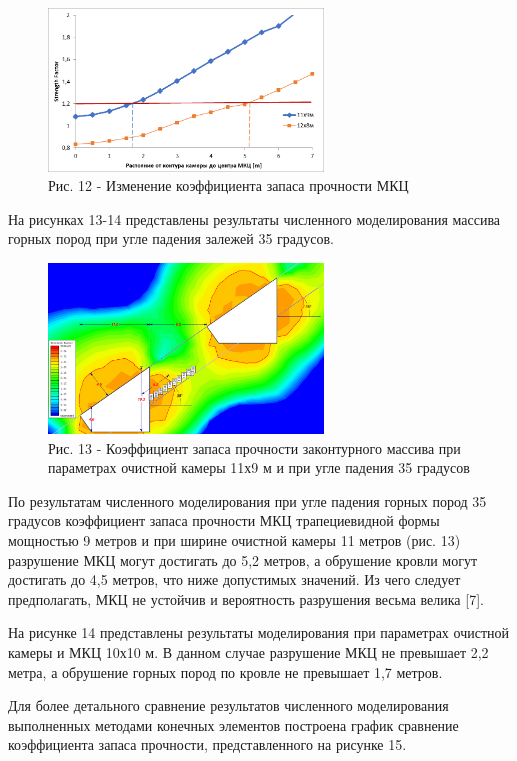 \begin{figure}[H]
	\centering
	\includegraphics[width=0.65\textwidth]{assets/292}
	\caption*{Рис. 12 - Изменение коэффициента запаса прочности МКЦ}
\end{figure}

На рисунках 13-14 представлены результаты численного моделирования
массива горных пород при угле падения залежей 35 градусов.

\begin{figure}[H]
	\centering
	\includegraphics[width=0.65\textwidth]{assets/293}
	\caption*{Рис. 13 - Коэффициент запаса прочности законтурного массива при
параметрах очистной камеры 11х9 м и при угле падения 35 градусов}
\end{figure}

\begin{multicols}{2}
По результатам численного моделирования при угле падения горных пород 35
градусов коэффициент запаса прочности МКЦ трапециевидной формы мощностью
9 метров и при ширине очистной камеры 11 метров (рис. 13) разрушение МКЦ
могут достигать до 5,2 метров, а обрушение кровли могут достигать до 4,5
метров, что ниже допустимых значений. Из чего следует предполагать, МКЦ
не устойчив и вероятность разрушения весьма велика {[}7{]}.

На рисунке 14 представлены результаты моделирования при параметрах
очистной камеры и МКЦ 10х10 м. В данном случае разрушение МКЦ не
превышает 2,2 метра, а обрушение горных пород по кровле не превышает 1,7
метров.

Для более детального сравнение результатов численного моделирования
выполненных методами конечных элементов построена график сравнение
коэффициента запаса прочности, представленного на рисунке 15.
\end{multicols}

